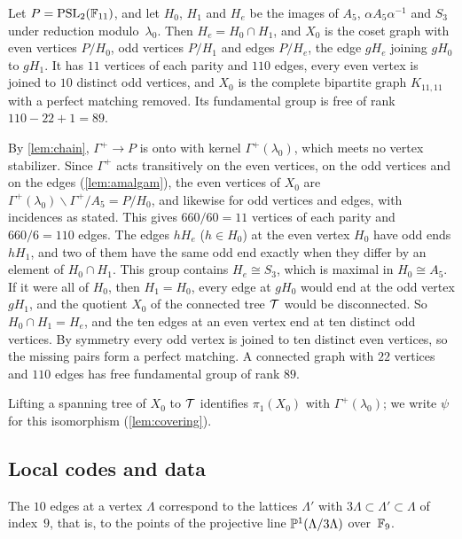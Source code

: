 \begin{lemma}\label{lem:basegraph}
\notformalized
Let $P=\operatorname{PSL}_2(\mathbb{F}_{11})$, and let $H_0$, $H_1$ and $H_e$ be the images of $A_5$, $\alpha A_5\alpha^{-1}$ and $S_3$ under
reduction modulo~$\lambda_0$. Then $H_e=H_0\cap H_1$, and $X_0$ is the coset graph with even vertices $P/H_0$, odd
vertices $P/H_1$ and edges $P/H_e$, the edge $gH_e$ joining $gH_0$ to $gH_1$. It has $11$ vertices of each parity and
$110$ edges, every even vertex is joined to $10$ distinct odd vertices, and $X_0$ is the complete bipartite graph
$K_{11,11}$ with a perfect matching removed. Its fundamental group is free of rank $110-22+1=89$.
\end{lemma}
\begin{informalproof}
By \cref{lem:chain}, $\Gamma^+\to P$ is onto with kernel $\Gamma^+(\lambda_0)$, which meets no vertex stabilizer. Since
$\Gamma^+$ acts transitively on the even vertices, on the odd vertices and on the edges (\cref{lem:amalgam}), the even
vertices of $X_0$ are $\Gamma^+(\lambda_0)\backslash\Gamma^+/A_5=P/H_0$, and likewise for odd vertices and edges, with
incidences as stated. This gives $660/60=11$ vertices of each parity and $660/6=110$ edges. The edges $hH_e$
($h\in H_0$) at the even vertex $H_0$ have odd ends $hH_1$, and two of them have the same odd end exactly when they differ
by an element of $H_0\cap H_1$. This group contains $H_e\cong S_3$, which is maximal in $H_0\cong A_5$. If it were all of
$H_0$, then $H_1=H_0$, every edge at $gH_0$ would end at the odd vertex $gH_1$, and the quotient $X_0$ of the connected
tree $\mathcal{T}$ would be disconnected. So $H_0\cap H_1=H_e$, and the ten edges at an even vertex end at ten distinct odd
vertices. By symmetry every odd vertex is joined to ten distinct even vertices, so the missing pairs form a perfect
matching. A connected graph with $22$ vertices and $110$ edges has free fundamental group of rank $89$.
\end{informalproof}

Lifting a spanning tree of $X_0$ to $\mathcal{T}$ identifies $\pi_1(X_0)$ with $\Gamma^+(\lambda_0)$; we write $\psi$ for this
isomorphism (\cref{lem:covering}).

\subsection{Local codes and data}\label{sec:datum}

The $10$ edges at a vertex $\Lambda$ correspond to the lattices $\Lambda'$ with $3\Lambda\subset\Lambda'\subset\Lambda$
of index~$9$, that is, to the points of the projective line $\mathbb{P}^1(\Lambda/3\Lambda)$ over~$\mathbb{F}_9$.

